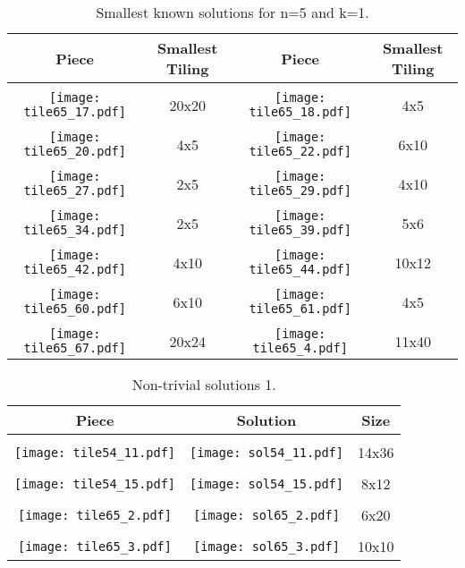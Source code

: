 \documentclass[10pt,a4paper]{article}
\theoremstyle{definition}
\begin{document}
\begin{table}[!htpb]
\centering
\begin{tabular}{|c|c|c|c|}
\hline
Piece & Smallest Tiling & Piece & Smallest Tiling\\ \hline
& & & \\ 
\texttt{[image: tile65\_17.pdf]} & 20x20 & \texttt{[image: tile65\_18.pdf]} & 4x5 \\ \hline
& & & \\ 
\texttt{[image: tile65\_20.pdf]} & 4x5 & \texttt{[image: tile65\_22.pdf]} & 6x10 \\ \hline
& & & \\ 
\texttt{[image: tile65\_27.pdf]} & 2x5 & \texttt{[image: tile65\_29.pdf]} & 4x10 \\ \hline
& & & \\ 
\texttt{[image: tile65\_34.pdf]} & 2x5 & \texttt{[image: tile65\_39.pdf]} & 5x6 \\ \hline
& & & \\ 
\texttt{[image: tile65\_42.pdf]} & 4x10 & \texttt{[image: tile65\_44.pdf]} & 10x12 \\ \hline
& & & \\ 
\texttt{[image: tile65\_60.pdf]} & 6x10 & \texttt{[image: tile65\_61.pdf]} & 4x5 \\ \hline
& & & \\ 
\texttt{[image: tile65\_67.pdf]} & 20x24 & \texttt{[image: tile65\_4.pdf]} & 11x40 \\ \hline
\end{tabular}
\caption{Smallest known solutions for n=5 and k=1.}
\label{tab:trivial-51b}
\end{table}

\begin{table}[!htpb]
\centering
\begin{tabular}{|c|c|c|}
\hline
Piece & Solution & Size\\ \hline
 & & \\ 
\texttt{[image: tile54\_11.pdf]} &\texttt{[image: sol54\_11.pdf]} &14x36 \\ \hline
 & & \\ 
\texttt{[image: tile54\_15.pdf]} &\texttt{[image: sol54\_15.pdf]} &8x12 \\ \hline
 & & \\ 
\texttt{[image: tile65\_2.pdf]} &\texttt{[image: sol65\_2.pdf]} &6x20 \\ \hline
 & & \\ 
\texttt{[image: tile65\_3.pdf]} &\texttt{[image: sol65\_3.pdf]} &10x10 \\ \hline
\end{tabular}
\caption{Non-trivial solutions 1.}
\label{tab:cool1}
\end{table}
\end{document}
